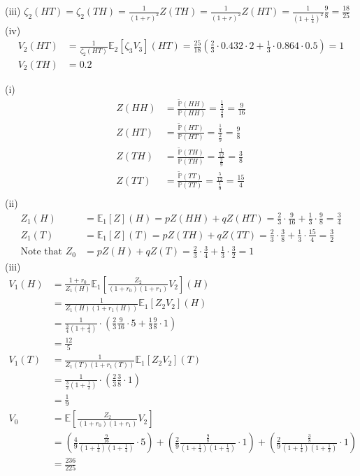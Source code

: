 \documentclass[12pt]{article}
\newenvironment{Exercise}[2][Exercise]{\begin{trivlist}
		\item[\hskip \labelsep {\bfseries #1}\hskip \labelsep {\bfseries #2.}]}{\end{trivlist}}
\begin{document}
	(iii) $\zeta_2(HT)=\zeta_2(TH)=\frac{1}{(1+r)^2}Z(TH)=\frac{1}{(1+r)^2}Z(HT)=\frac{1}{(1+\frac{1}{4})^2}\frac{9}{8}=\frac{18}{25}$\\
	(iv) 
	\begin{align*}
	V_2(HT)&=\frac{1}{\zeta_2(HT)}\mathbb{E}_2[\zeta_3V_3](HT)=\frac{25}{18}\left(\frac{2}{3}\cdot 0.432\cdot 2+\frac{1}{3}\cdot 0.864\cdot 0.5\right)=1\\
	V_2(TH)&=0.2
	\end{align*}
	\begin{Exercise}{5} \end{Exercise}
	(i)
	\begin{align*} 
	Z(HH) &= \frac{\tilde{\mathbb{P}}(HH)}{\mathbb{P}(HH)} = \frac{\frac{1}{4}}{\frac{4}{9}}=\frac{9}{16}\\
	Z(HT) &= \frac{\tilde{\mathbb{P}}(HT)}{\mathbb{P}(HT)} = \frac{\frac{1}{4}}{\frac{2}{9}}=\frac{9}{8}\\
	Z(TH) &= \frac{\tilde{\mathbb{P}}(TH)}{\mathbb{P}(TH)} = \frac{\frac{1}{12}}{\frac{2}{9}}=\frac{3}{8}\\
	Z(TT) &= \frac{\tilde{\mathbb{P}}(TT)}{\mathbb{P}(TT)} = \frac{\frac{5}{12}}{\frac{1}{9}}=\frac{15}{4}\\
	\end{align*}
	(ii)
	\begin{align*}
	Z_1(H) &= \mathbb{E}_1[Z](H)=p Z(HH)+qZ(HT) = \frac{2}{3}\cdot\frac{9}{16}+\frac{1}{3}\cdot\frac{9}{8}=\frac{3}{4}\\
	Z_1(T) &= \mathbb{E}_1[Z](T)=p Z(TH)+qZ(TT) = \frac{2}{3}\cdot\frac{3}{8}+\frac{1}{3}\cdot\frac{15}{4}=\frac{3}{2}\\
	\text{Note that }Z_0 &= pZ(H)+qZ(T)=\frac{2}{3}\cdot\frac{3}{4}+\frac{1}{3}\cdot\frac{3}{2}=1
	\end{align*}
	(iii)
	\begin{align*}
		V_1(H)&=\frac{1+r_0}{Z_1(H)}\mathbb{E}_1\left[\frac{Z_2}{(1+r_0)(1+r_1)}V_2\right](H)\\
			&=\frac{1}{Z_1(H)(1+r_1(H))}\mathbb{E}_1[Z_2V_2](H)\\
			&=\frac{1}{\frac{3}{4}(1+\frac{1}{4})}\cdot\left(\frac{2}{3}\frac{9}{16}\cdot 5+\frac{1}{3}\frac{9}{8}\cdot 1\right)\\
			&=\frac{12}{5}\\
		V_1(T)&=\frac{1}{Z_1(T)(1+r_1(T))}\mathbb{E}_1[Z_2V_2](T)\\
			&=\frac{1}{\frac{3}{2}(1+\frac{1}{2})}\cdot\left(\frac{2}{3}\frac{3}{8}\cdot 1\right)\\
			&=\frac{1}{9}\\
		V_0 &= \mathbb{E}\left[\frac{Z_2}{(1+r_0)(1+r_1)}V_2\right]\\
			&=\left(\frac{4}{9}\frac{\frac{9}{16}}{(1+\frac{1}{4})(1+\frac{1}{4})}\cdot 5\right)+\left(\frac{2}{9}\frac{\frac{9}{8}}{(1+\frac{1}{4})(1+\frac{1}{4})}\cdot 1\right)+\left(\frac{2}{9}\frac{\frac{3}{8}}{(1+\frac{1}{4})(1+\frac{1}{2})}\cdot 1\right)\\
			&=\frac{236}{225}
	\end{align*}
 
\end{document}
